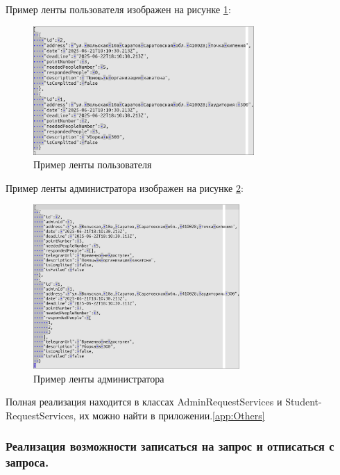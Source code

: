 Пример ленты пользователя изображен на рисунке \ref{fig:PublicFeed}:

\newpage
\begin{figure}[!h]
    \centering
    \includegraphics[width = 0.75\textwidth]{imgs/PublicFeed.png}
    \caption{Пример ленты пользователя}
    \label{fig:PublicFeed}
\end{figure}

Пример ленты администратора изображен на рисунке \ref{fig:AdminFeed}:

\begin{figure}[!h]
    \centering
    \includegraphics[width = 0.7\textwidth]{imgs/AdminFeed.png}
    \caption{Пример ленты администратора}
    \label{fig:AdminFeed}
\end{figure}

Полная реализация находится в классах AdminRequestServices и Student- RequestServices, их можно найти в приложении.\ref{app:Others}

\subsubsection{Реализация возможности записаться на запрос и отписаться с запроса.}

